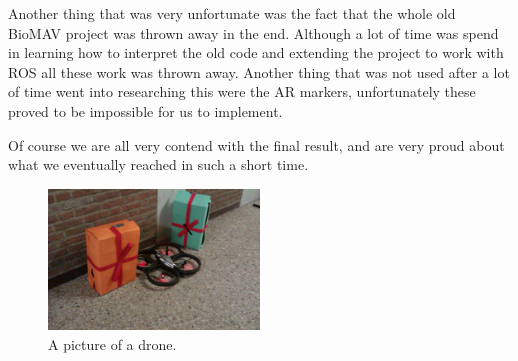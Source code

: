 \documentclass[a4paper,10pt]{article}
\begin{document}
Another thing that was very unfortunate was the fact that the whole old BioMAV project was thrown away in the end. 
Although a lot of time was spend in learning how to interpret the old code and extending the project to work with ROS all these work was thrown away. 
Another thing that was not used after a lot of time went into researching this were the AR markers, unfortunately these proved to be impossible for us to implement. 

Of course we are all very contend with the final result, and are very proud about what we eventually reached in such a short time. 

\begin{figure}[h!]
	\caption{A picture of a drone.}
	\centering
	\includegraphics[width=0.5\textwidth]{images/presentsAndDrone}
\end{figure}


\end{document}
